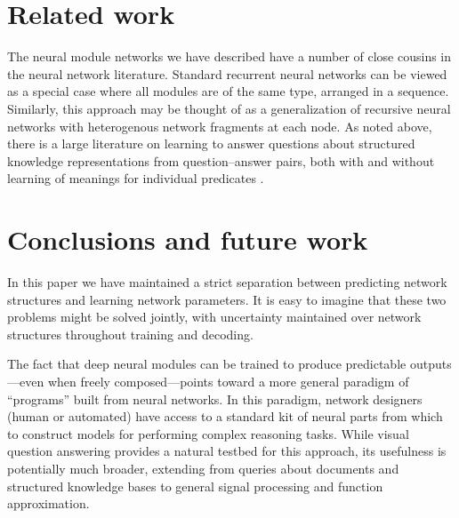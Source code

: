\documentclass{article} %
\theoremstyle{definition}
\theoremstyle{example}
\begin{document}
\section{Related work}

The neural module networks we have described have a number of close cousins in
the neural network literature. Standard recurrent neural networks
\cite{Elman90RNN} can be viewed as a special case where all modules are of the
same type, arranged in a sequence. Similarly, this approach may be thought of as
a generalization of recursive neural networks \cite{Socher13CVG} with
heterogenous network fragments at each node. As noted above, there is a large
literature on learning to answer questions about structured knowledge
representations from question--answer pairs, both with and without learning of
meanings for individual predicates \cite{Liang13DCS,Krish2013Grounded}.

\section{Conclusions and future work}

In this paper we have maintained a strict separation between predicting network
structures and learning network parameters. It is easy to imagine that these two
problems might be solved jointly, with uncertainty maintained over network
structures throughout training and decoding.

The fact that deep neural modules can be trained to produce predictable
outputs---even when freely composed---points toward a more general paradigm of
``programs'' built from neural networks. In this paradigm, network designers
(human or automated) have access to a standard kit of neural parts from which to
construct models for performing complex reasoning tasks. While visual question
answering provides a natural testbed for this approach, its usefulness is
potentially much broader, extending from queries about documents and structured
knowledge bases to general signal processing and function approximation.



\end{document}
